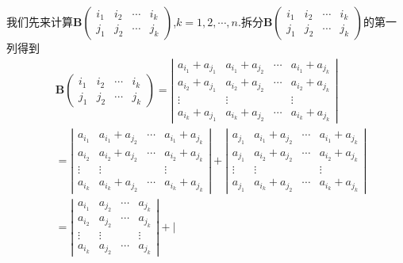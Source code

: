 \documentclass[../../main.tex]{subfiles}
\begin{document}
\begin{solution}
\begin{enumerate}[(1)]
我们先来计算\(\boldsymbol{B}\left(\begin{matrix}
i_1 & i_2 & \cdots & i_k\\
j_1 & j_2 & \cdots & j_k
\end{matrix}\right)\),\(k = 1,2,\cdots,n\).拆分\(\boldsymbol{B}\left(\begin{matrix}
i_1 & i_2 & \cdots & i_k\\
j_1 & j_2 & \cdots & j_k
\end{matrix}\right)\)的第一列得到
\begin{align*}
&\boldsymbol{B}\left(\begin{matrix}
i_1 & i_2 & \cdots & i_k\\
j_1 & j_2 & \cdots & j_k
\end{matrix}\right) = \left|\begin{matrix}
a_{i_1} + a_{j_1} & a_{i_1} + a_{j_2} & \cdots & a_{i_1} + a_{j_k}\\
a_{i_2} + a_{j_1} & a_{i_2} + a_{j_2} & \cdots & a_{i_2} + a_{j_k}\\
\vdots & \vdots &  & \vdots\\
a_{i_k} + a_{j_1} & a_{i_k} + a_{j_2} & \cdots & a_{i_k} + a_{j_k}
\end{matrix}\right|
\\
&=\left|\begin{matrix}
a_{i_1} & a_{i_1} + a_{j_2} & \cdots & a_{i_1} + a_{j_k}\\
a_{i_2} & a_{i_2} + a_{j_2} & \cdots & a_{i_2} + a_{j_k}\\
\vdots & \vdots &  & \vdots\\
a_{i_k} & a_{i_k} + a_{j_2} & \cdots & a_{i_k} + a_{j_k}
\end{matrix}\right| + \left|\begin{matrix}
a_{j_1} & a_{i_1} + a_{j_2} & \cdots & a_{i_1} + a_{j_k}\\
a_{j_1} & a_{i_2} + a_{j_2} & \cdots & a_{i_2} + a_{j_k}\\
\vdots & \vdots &  & \vdots\\
a_{j_1} & a_{i_k} + a_{j_2} & \cdots & a_{i_k} + a_{j_k}
\end{matrix}\right|
\\
&=\left|\begin{matrix}
a_{i_1} & a_{j_2} & \cdots & a_{j_k}\\
a_{i_2} & a_{j_2} & \cdots & a_{j_k}\\
\vdots & \vdots &  & \vdots\\
a_{i_k} & a_{j_2} & \cdots & a_{j_k}
\end{matrix}\right| + \left|\begin{matrix}

\end{matrix}
\end{align*}
\end{enumerate}
\end{solution}
\end{document}
